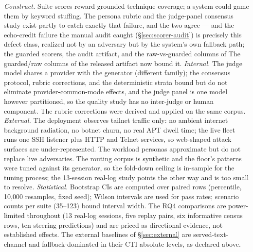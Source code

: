 \emph{Construct.} Suite scores reward grounded technique coverage; a
system could game them by keyword stuffing. The persona rubric and the
judge-panel consensus study exist partly to catch exactly that failure,
and the two agree --- and the echo-credit failure the manual audit
caught (\S\ref{sec:scorer-audit}) is precisely this defect class,
realized not by an adversary but by the system's own fallback path; the
guarded scorers, the audit artifact, and the raw-vs-guarded columns of
The guarded/raw columns of the released artifact now bound it. \emph{Internal.} The judge
model shares a provider with the generator (different family); the
consensus protocol, rubric corrections, and the deterministic strata
bound but do not eliminate provider-common-mode effects, and the judge
panel is one model however partitioned, so the quality study has no
inter-judge or human component. The rubric corrections were derived and
applied on the same corpus. \emph{External.} The deployment observes
tailnet traffic only: no ambient internet background radiation, no
botnet churn, no real APT dwell time; the live fleet runs one SSH
listener plus HTTP and Telnet services, so web-shaped attack surfaces
are under-represented. The workload personas approximate but do not
replace live adversaries. The routing corpus is synthetic and the
floor's patterns were tuned against its generator, so the fold-down
ceiling is in-sample for the tuning process; the 13-session real-log
study points the other way and is too small to resolve. \emph{Statistical.}
Bootstrap CIs are computed over paired rows (percentile, 10{,}000
resamples, fixed seed); Wilson intervals are used for pass rates;
scenario counts per suite (35--123) bound interval width. The RQ4
comparisons are power-limited throughout (13 real-log sessions, five
replay pairs, six informative census rows, ten steering predictions) and
are priced as directional evidence, not established effects. The
external baselines of \S\ref{sec:external} are served-text-channel and
fallback-dominated in their CTI absolute levels, as declared above.